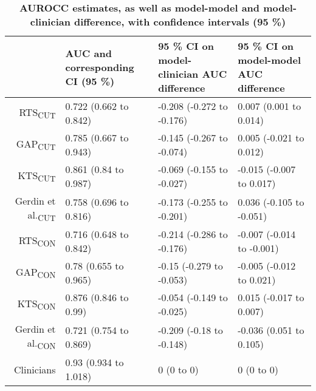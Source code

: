 \begin{table}[!ht]
\centering
\caption{\bf AUROCC estimates, as well as model-model and model-clinician difference, with confidence intervals (95 \%)} 
\label{table:auc}
\begin{adjustbox}{max width = \linewidth} 
\begin{tabular} 
{rlll}
  \toprule
 & AUC and corresponding CI (95 \%) & 95 \% CI on model-clinician AUC difference & 95 \% CI on model-model AUC difference \\ 
  \midrule
RTS\textsubscript{CUT} & 0.722 (0.662 to 0.842) & -0.208 (-0.272 to -0.176) & 0.007 (0.001 to 0.014) \\ 
  GAP\textsubscript{CUT} & 0.785 (0.667 to 0.943) & -0.145 (-0.267 to -0.074) & 0.005 (-0.021 to 0.012) \\ 
  KTS\textsubscript{CUT} & 0.861 (0.84 to 0.987) & -0.069 (-0.155 to -0.027) & -0.015 (-0.007 to 0.017) \\ 
  Gerdin et al.\textsubscript{CUT} & 0.758 (0.696 to 0.816) & -0.173 (-0.255 to -0.201) & 0.036 (-0.105 to -0.051) \\ 
  RTS\textsubscript{CON} & 0.716 (0.648 to 0.842) & -0.214 (-0.286 to -0.176) & -0.007 (-0.014 to -0.001) \\ 
  GAP\textsubscript{CON} & 0.78 (0.655 to 0.965) & -0.15 (-0.279 to -0.053) & -0.005 (-0.012 to 0.021) \\ 
  KTS\textsubscript{CON} & 0.876 (0.846 to 0.99) & -0.054 (-0.149 to -0.025) & 0.015 (-0.017 to 0.007) \\ 
  Gerdin et al.\textsubscript{CON} & 0.721 (0.754 to 0.869) & -0.209 (-0.18 to -0.148) & -0.036 (0.051 to 0.105) \\ 
  Clinicians & 0.93 (0.934 to 1.018) & 0 (0 to 0) & 0 (0 to 0) \\ 
   \bottomrule
\end{tabular} 
\end{adjustbox}
\end{table}

